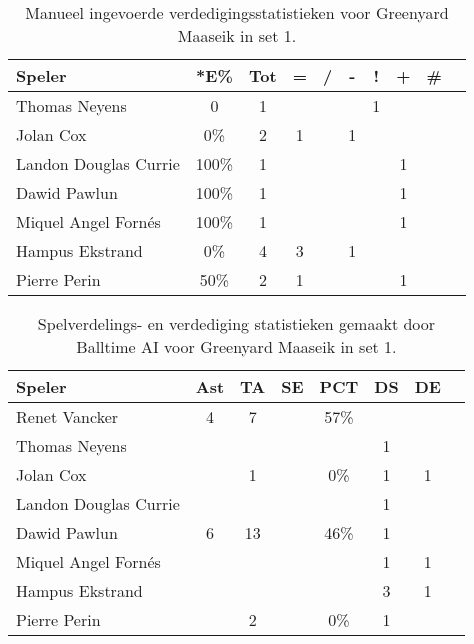 \begin{table}[ht!]
    \centering
    \scriptsize
    \begin{tabular}{|l|c|c|c|c|c|c|c|c|c|} \hline
        \textbf{Speler}  & *E\% & Tot & = & / & - & ! & + & \# \\ \hline
        Thomas Neyens & 0 & 1 & & & & 1 & & \\
        Jolan Cox & 0\% & 2 & 1 &  & 1 &  &  &  \\ 
        Landon Douglas Currie & 100\% & 1 &  &  &  &  & 1 &  \\ 
        Dawid Pawlun & 100\% & 1 &  &  &  &  & 1 &  \\ 
        Miquel Angel Fornés & 100\% & 1 &  &  &  &  & 1 &  \\ 
        Hampus Ekstrand & 0\% & 4 & 3 &  & 1 &  &  &  \\ 
        Pierre Perin & 50\% & 2 & 1 &  &  &  & 1 &  \\ \hline
    \end{tabular}
    \caption[Manueel ingevoerde verdedigingsstatistieken voor Greenyard Maaseik in set 1]{\label{tab:PL1DigMaaseikMan1}Manueel ingevoerde verdedigingsstatistieken voor Greenyard Maaseik in set 1.}
\end{table}

\begin{table}[ht!]
  \centering
  \scriptsize
  \begin{tabular}{|l|c|c|c|c|c|c|c|}  \hline
    \textbf{Speler} & Ast & TA & SE & PCT & DS & DE \\ \hline
    Renet Vancker & 4 & 7 &  & 57\% &  &  \\
    Thomas Neyens &  &  &  &  & 1 &  \\
    Jolan Cox &  & 1 &  & 0\% & 1 & 1 \\
    Landon Douglas Currie &  &   &  &  & 1 &  \\
    Dawid Pawlun & 6 & 13 &  & 46\% & 1 &  \\
    Miquel Angel Fornés &  &  &  &  & 1 & 1 \\
    Hampus Ekstrand &  &  &  &  & 3 & 1 \\
    Pierre Perin &  & 2 &  & 0\% & 1 &  \\ \hline
  \end{tabular}
  \caption[Spelverdelings- en verdedigingsstatistieken gemaakt door Balltime AI voor Greenyard Maaseik in set 1]{\label{tab:PL1SetDigMaaseikAI1}Spelverdelings- en verdediging statistieken gemaakt door Balltime AI voor Greenyard Maaseik in set 1.}
\end{table}

